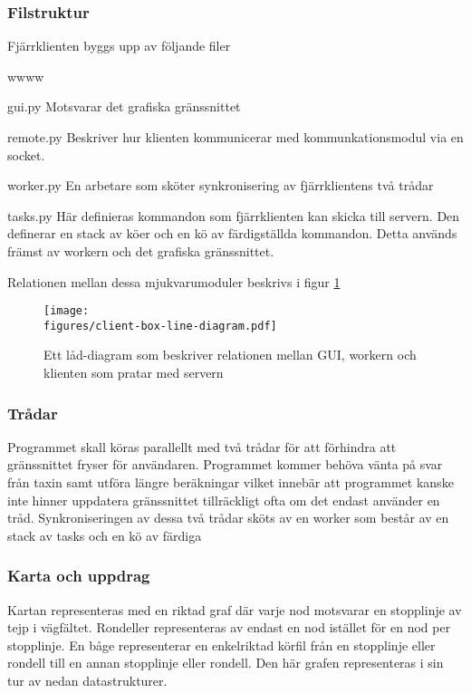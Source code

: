 \documentclass[tekniskrapport/tech.tex]{subfiles}
\begin{document}
\subsubsection{Filstruktur}
Fjärrklienten byggs upp av följande filer

\begin{labeling}{wwww}
	\item[gui.py] 	Motsvarar det grafiska gränssnittet
	
	\item[remote.py] Beskriver hur klienten kommunicerar med
		kommunkationsmodul via en socket.
	
	\item[worker.py] En arbetare som sköter synkronisering av
		fjärrklientens två trådar
	
	\item[tasks.py]	Här definieras kommandon som fjärrklienten kan skicka
		till servern.  Den definerar en stack av köer och en kö av
		färdigställda kommandon.  Detta används främst av workern och
		det grafiska gränssnittet.
\end{labeling}
Relationen mellan dessa mjukvarumoduler beskrivs i figur \ref{boxclient}

\begin{figure}[h]
\centering
	\texttt{[image: \\figures/client-box-line-diagram.pdf]}
	\caption{Ett låd-diagram som beskriver relationen mellan GUI,
	workern och klienten som pratar med servern}
	\label{boxclient}
\end{figure} 

\subsubsection{Trådar}
Programmet skall köras parallellt med två trådar för att förhindra att
gränssnittet fryser för användaren. Programmet kommer behöva vänta på svar från
taxin samt utföra längre beräkningar vilket innebär att programmet kanske inte
hinner uppdatera gränssnittet tillräckligt ofta om det endast använder en tråd.
Synkroniseringen av dessa två trådar sköts av en worker som består av
en stack av tasks och en kö av färdiga 



\subsubsection{Karta och uppdrag}
Kartan representeras med en riktad graf där varje nod motsvarar en stopplinje
av tejp i vägfältet. Rondeller representeras av endast en nod istället för en
nod per stopplinje. En båge representerar en enkelriktad körfil från en
stopplinje eller rondell till en annan stopplinje eller rondell. Den här grafen
representeras i sin tur av nedan datastrukturer.
\end{document}
